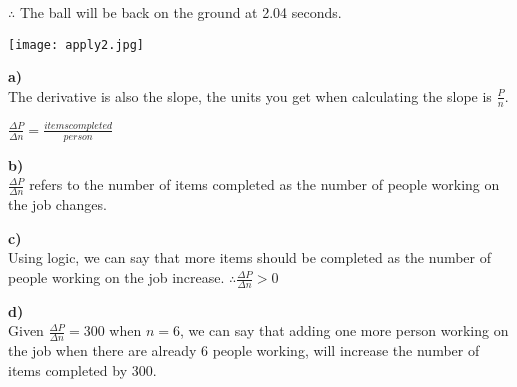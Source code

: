 \documentclass[12pt,fleqn]{book} %
\begin{document}
\noindent $\therefore$ The ball will be back on the ground at 2.04 seconds.

\pagebreak

\texttt{[image: apply2.jpg]}

\noindent \textbf{a)} \\
The derivative is also the slope, the units you get when calculating the slope is $\frac{P}{n}$.

\begin{center}
    {\large $\frac{\Delta P}{\Delta n} = \frac{items completed}{person}$}
\end{center}

\noindent \textbf{b)} \\
$\frac{\Delta P}{\Delta n}$ refers to the number of items completed as the number of people working on the job changes.

\vspace*{3mm}

\noindent \textbf{c)} \\
Using logic, we can say that more items should be completed as the number of people working on the job increase. $\therefore \frac{\Delta P}{\Delta n} > 0$

\vspace*{3mm}

\noindent \textbf{d)} \\
Given $\frac{\Delta P}{\Delta n} = 300$ when $n=6$, we can say that adding one more person working on the job when there are already 6 people working, will increase the number of items completed by 300.
\end{document}
